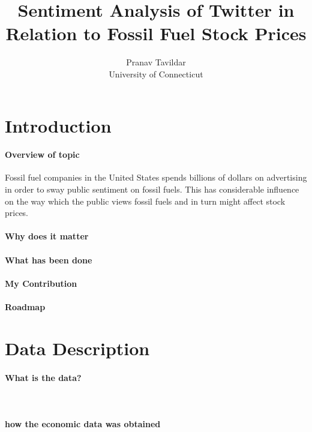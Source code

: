 \documentclass[12pt]{article}
\title{Sentiment Analysis of Twitter in Relation to Fossil Fuel Stock Prices}
\author{Pranav Tavildar\\
  University of Connecticut
}
\begin{document}
\maketitle

\section{Introduction}

\paragraph{Overview of topic}
Fossil fuel companies in the United States spends billions of dollars on advertising in order to sway public sentiment on fossil fuels. This has considerable influence on the way which the public views fossil fuels and in turn might affect stock prices.

\paragraph{Why does it matter}

\paragraph{What has been done}

\paragraph{My Contribution}

\paragraph{Roadmap}


\section{Data Description}

\paragraph{What is the data?}\

\paragraph{how the economic data was obtained}
\end{document}
